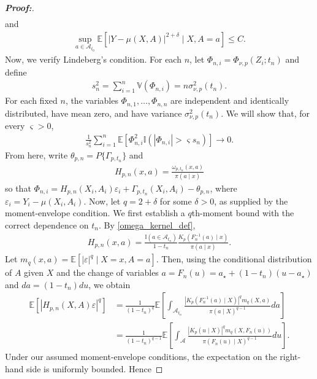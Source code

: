 \documentclass[11pt,twoside]{article}
\theoremstyle{definition}
\theoremstyle{remark}
\begin{document}
\begin{proof}[\textbf{Proof:}]
\begin{align*}
\end{align*}
and
\begin{align*}
    \sup_{a\in\mathcal{A}_{t_0}} \mathbb{E}\!\left[ |Y-\mu(X,A)|^{2+\delta} \mid X,A=a \right] \leq C.
\end{align*}
Now, we verify Lindeberg's condition. For each $n$, let $\Phi_{n,i} = \Phi_{\nu,p}(Z_i;t_n)$ and define
\begin{align*}
    s_n^2 = \sum_{i=1}^{n}\mathbb{V}(\Phi_{n,i}) = n\sigma_{\nu,p}^2(t_n).
\end{align*}
For each fixed $n$, the variables $\Phi_{n,1},\ldots,\Phi_{n,n}$ are independent and identically distributed, have mean zero, and have variance $\sigma_{\nu,p}^2(t_n)$. We will show that, for every $\varsigma > 0$,
\begin{align*}
      \frac{1}{s_n^2} \sum_{i=1}^{n} \mathbb{E}\!\left[\Phi_{n,i}^2 \mathbb{I}\!\left( |\Phi_{n,i}|>\varsigma s_n \right) \right] \longrightarrow 0.
\end{align*}
From here, write $\theta_{p,n} = P \{\Gamma_{p,t_n}\}$ and
\begin{align*}
      H_{p,n}(x,a) = \frac{\omega_{p,t_n}(x,a)}{\pi(a\mid x)}
\end{align*}
so that $\Phi_{n,i} = H_{p,n}(X_i,A_i)\varepsilon_i + \Gamma_{p,t_n}(X_i,A_i) - \theta_{p,n}$, where $\varepsilon_i=Y_i-\mu(X_i,A_i)$. Now, let $q = 2+\delta$ for some $\delta > 0$, as supplied by the moment-envelope condition. We first establish a $q$th-moment bound with the correct dependence on $t_n$. By \cref{omega_kernel_def},
\begin{align*}
     H_{p,n}(x,a) = \frac{\mathbb{I}(a\in\mathcal A_{t_n})}{1-t_n} \frac{K_p\!\left(F_n^{-1}(a)\mid x\right)}{\pi(a\mid x) }.
\end{align*}
Let $m_q(x,a) = \mathbb{E}\!\left[ |\varepsilon|^q \mid X=x,A=a \right]$. Then, using the conditional distribution of $A$ given $X$ and the change of
variables $a=F_n(u)=a_\star+(1-t_n)(u-a_\star)$ and $da=(1-t_n)du$, we obtain
\begin{align*}
    \mathbb{E}\left[ \left| H_{p,n}(X,A)\varepsilon \right|^q \right] &= \frac{1}{(1-t_n)^q} \mathbb{E}\!\left[ \int_{\mathcal{A}_{t_n}} \frac{ \left| K_p(F_n^{-1}(a)\mid X) \right|^q m_q(X,a)}{\pi(a\mid X)^{q-1}} da \right] \\
    &= \frac{1}{(1-t_n)^{q-1}} \mathbb{E}\!\left[
        \int_{\mathcal{A}} \frac{ |K_p(u\mid X)|^q m_q(X,F_n(u))}{ \pi(F_n(u)\mid X)^{q-1} } du \right].
\end{align*}
Under our assumed moment-envelope conditions, the expectation on the right-hand side is uniformly bounded. Hence

\end{proof}
\end{document}

